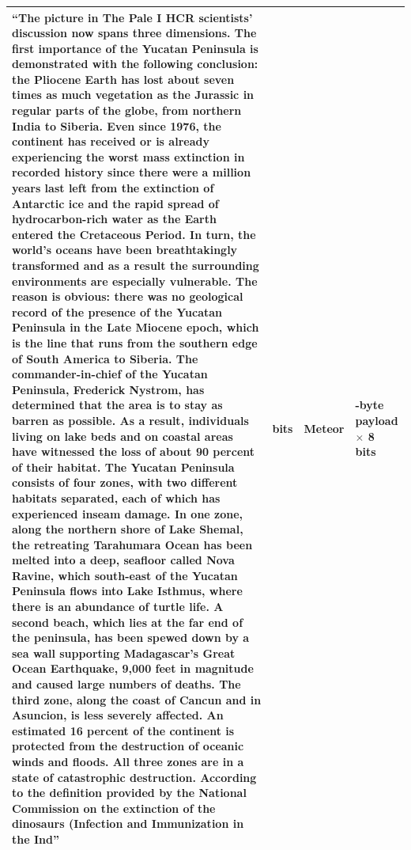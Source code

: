 \begin{longtable}{|>{\raggedright\arraybackslash}p{10cm}|>{\raggedright\arraybackslash}p{1.2cm}|>{\raggedright\arraybackslash}p{1cm}|>{\raggedright\arraybackslash}p{2cm}|}
  ``The picture in The Pale I HCR scientists' discussion now spans three dimensions. The first importance of the Yucatan Peninsula is demonstrated with the following conclusion: the Pliocene Earth has lost about seven times as much vegetation as the Jurassic in regular parts of the globe, from northern India to Siberia. Even since 1976, the continent has received or is already experiencing the worst mass extinction in recorded history since there were a million years last left from the extinction of Antarctic ice and the rapid spread of hydrocarbon-rich water as the Earth entered the Cretaceous Period. In turn, the world’s oceans have been breathtakingly transformed and as a result the surrounding environments are especially vulnerable. The reason is obvious: there was no geological record of the presence of the Yucatan Peninsula in the Late Miocene epoch, which is the line that runs from the southern edge of South America to Siberia. The commander-in-chief of the Yucatan Peninsula, Frederick Nystrom, has determined that the area is to stay as barren as possible. As a result, individuals living on lake beds and on coastal areas have witnessed the loss of about 90 percent of their habitat. The Yucatan Peninsula consists of four zones, with two different habitats separated, each of which has experienced inseam damage. In one zone, along the northern shore of Lake Shemal, the retreating Tarahumara Ocean has been melted into a deep, seafloor called Nova Ravine, which south-east of the Yucatan Peninsula flows into Lake Isthmus, where there is an abundance of turtle life. A second beach, which lies at the far end of the peninsula, has been spewed down by a sea wall supporting Madagascar’s Great Ocean Earthquake, 9,000 feet in magnitude and caused large numbers of deaths. The third zone, along the coast of Cancun and in Asuncion, is less severely affected. An estimated 16 percent of the continent is protected from the destruction of oceanic winds and floods. All three zones are in a state of catastrophic destruction. According to the definition provided by the National Commission on the extinction of the dinosaurs (Infection and Immunization in the Ind'' & 1280 bits    & Meteor          & 160-byte payload $\times$ 8 bits                       \\ \hline

\end{longtable}
